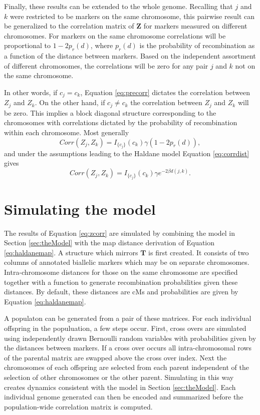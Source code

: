 \documentclass[sts]{imsart}
\newcommand{\ve}[1]{\mathbf{#1}}           %
\newcommand{\m}[1]{\mathbf{#1}}               %
\newcommand{\ind}[2]{I_{#2} \left( #1 \right)}
\begin{document}
Finally, these results can be extended to the whole genome. Recalling that $j$ and $k$ were restricted to be markers on the same chromosome, this pairwise result can be generalized to the correlation matrix of $\ve{Z}$ for markers measured on different chromosomes. For markers on the same chromosome correlations will be proportional to $1 - 2p_r(d)$, where $p_r(d)$ is the probability of recombination as a function of the distance between markers. Based on the independent assortment of different chromosomes, the correlations will be zero for any pair $j$ and $k$ not on the same chromosome.

In other words, if $c_j = c_k$, Equation \ref{eq:precorr} dictates the correlation between $Z_j$ and $Z_k$. On the other hand, if $c_j \neq c_k$ the correlation between $Z_j$ and $Z_k$ will be zero. This implies a block diagonal structure corresponding to the chromosomes with correlations dictated by the probability of recombination within each chromosome. Most generally
\begin{equation} \label{eq:zcorr_gen}
  Corr(Z_j, Z_k) = \ind{c_k}{\{c_j\}} \gamma (1 - 2p_r(d)),
\end{equation}
and under the assumptions leading to the Haldane model Equation \ref{eq:corrdist} gives
\begin{equation} \label{eq:zcorr}
  Corr(Z_j, Z_k) = \ind{c_k}{\{c_j\}} \gamma e^{-2 \beta d(j,k)}.
\end{equation}

\section{Simulating the model} \label{sec:sim}

The results of Equation \ref{eq:zcorr} are simulated by combining the model in Section \ref{sec:theModel} with the map distance derivation of Equation \ref{eq:haldanemap}. A structure which mirrors $\m{T}$ is first created. It consists of two columns of annotated biallelic markers which may be on separate chromosomes. Intra-chromosome distances for those on the same chromosome are specified together with a function to generate recombination probabilities given these distances. By default, these distances are cMs and probabilities are given by Equation \ref{eq:haldanemap}.

A populaton can be generated from a pair of these matrices. For each individual offspring in the populuation, a few steps occur. First, cross overs are simulated using independently drawn Bernoulli random variables with probabilities given by the distances between markers. If a cross over occurs all intra-chromosomal rows of the parental matrix are swapped above the cross over index. Next the chromosomes of each offspring are selected from each parent independent of the selection of other chromosomes or the other parent. Simulating in this way creates dynamics consistent with the model in Section \ref{sec:theModel}. Each individual genome generated can then be encoded and summarized before the population-wide correlation matrix is computed.
\end{document}

